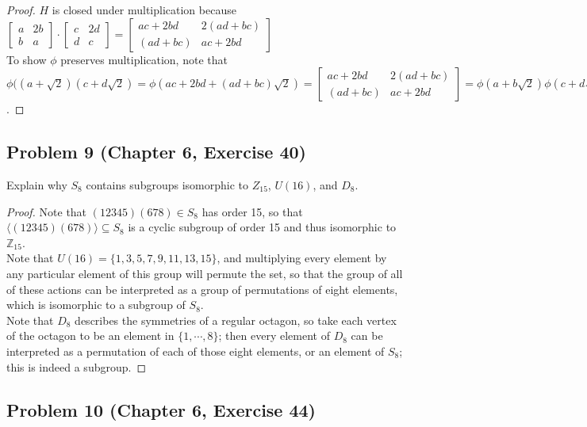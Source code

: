 \documentclass{article}
\begin{document}
\begin{proof}
$H$ is closed under multiplication because $\begin{bmatrix}
a & 2b \\
b & a \end{bmatrix} \cdot \begin{bmatrix}
c & 2d \\
d & c \end{bmatrix} = \begin{bmatrix}
ac+2bd & 2(ad+bc) \\
(ad+bc) & ac+2bd \end{bmatrix}$ \\
To show $\phi$ preserves multiplication, note that $\phi((a+\sqrt{2})(c+d\sqrt{2}) = \phi(ac+2bd+(ad+bc)\sqrt{2}) = \begin{bmatrix}
ac+2bd & 2(ad+bc) \\
(ad+bc) & ac+2bd \end{bmatrix} = \phi(a+b\sqrt{2})\phi(c+d\sqrt{2})$.

\end{proof}

\subsection*{Problem 9 (Chapter 6, Exercise 40)}

Explain why $S_8$ contains subgroups isomorphic to $Z_{15}$, $U(16)$, and $D_8$.

\begin{proof}

Note that $(12345)(678) \in S_8$ has order 15, so that $\langle (12345)(678) \rangle \subseteq S_8$ is a cyclic subgroup of order 15 and thus isomorphic to $\mathbb{Z}_{15}$. \\
Note that $U(16) = \{1, 3, 5, 7, 9, 11, 13, 15\}$, and multiplying every element by any particular element of this group will permute the set, so that the group of all of these actions can be interpreted as a group of permutations of eight elements, which is isomorphic to a subgroup of $S_8$. \\
Note that $D_8$ describes the symmetries of a regular octagon, so take each vertex of the octagon to be an element in $\{1, \cdots, 8\}$; then every element of $D_8$ can be interpreted as a permutation of each of those eight elements, or an element of $S_8$; this is indeed a subgroup.

\end{proof}

\subsection*{Problem 10 (Chapter 6, Exercise 44)}
\end{document}
